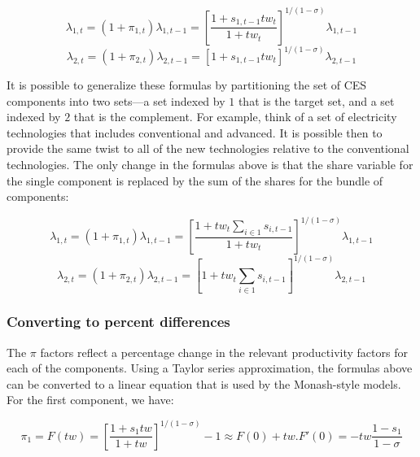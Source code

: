 \begin{displaymath}
{{\lambda }_{1,t}}=(1+{{\pi }_{1,t}}){{\lambda }_{1,t-1}}={{\left[ \frac{1+{{s}_{1,t-
1}}t{{w}_{t}}}{1+t{{w}_{t}}} \right]}^{1/(1-\sigma )}}{{\lambda }_{1,t-1}}
\end{displaymath}
\begin{displaymath}
{{\lambda }_{2,t}}=(1+{{\pi }_{2,t}}){{\lambda }_{2,t-1}}=
{{\left[ 1+{{s}_{1,t-1}}t{{w}_{t}} \right]}^{1/(1-\sigma )}}{{\lambda }_{2,t-1}}
\end{displaymath}

It is possible to generalize these formulas by partitioning the set of
CES components into two sets---a set indexed by $1$ that is the target set, and a set
indexed by $2$ that is the complement. For example, think of a set of electricity technologies
that includes conventional and advanced. It is possible then to provide the same twist to
all of the new technologies relative to the conventional technologies. The only change
in the formulas above is that the share variable for the single component is
replaced by the sum of the shares for the bundle of components:

\begin{displaymath}
{{\lambda }_{1,t}}=(1+{{\pi }_{1,t}}){{\lambda }_{1,t-1}}=
{{\left[ \frac{1+\mathit{tw_{t}} \sum_{i\in{1}}{s_{i,t-1}}}
{1+\mathit{tw_{t}}} \right]}^{1/(1-\sigma )}}{{\lambda }_{1,t-1}}
\end{displaymath}
\begin{displaymath}
{{\lambda }_{2,t}}=(1+{{\pi }_{2,t}}){{\lambda }_{2,t-1}}=
{\left[ 1 + \mathit{tw_{t}} \sum_{i\in{1}}{s_{i,t-1}} \right]}^{1/(1-\sigma )}{{\lambda }_{2,t-1}}
\end{displaymath}

\subsubsection{Converting to percent differences}

The $\pi$ factors reflect a percentage change in the relevant productivity
factors for each of the components. Using a Taylor series approximation,
the formulas above can be converted to a linear equation that is
used by the Monash-style models. For the first component, we have:

\begin{displaymath}
\pi_1=F(tw) = \left[ \frac{1+s_1 tw}{1+tw} \right]^{1/(1-\sigma)}-1 \approx F(0) + tw.F'(0)=-tw\frac{1-s_1}{1-\sigma}
\end{displaymath}

